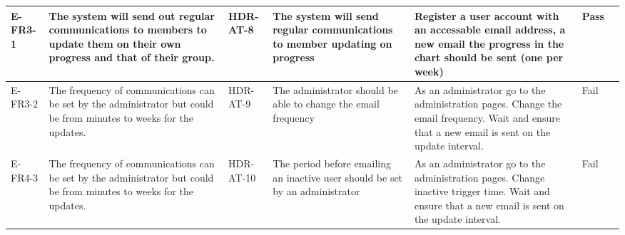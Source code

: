 \begin{longtable}{ |l|p{3cm}|l|p{5cm}|p{5cm}|l|p{6.5cm}|}
E-FR3-1 & The system will send out regular communications to members to update them on their own progress and that of their group. & HDR-AT-8 & The system will send regular communications to member updating on progress & Register a user account with an accessable email address, a new email the progress in the chart should be sent (one per week) & Pass &  \\ \hline
E-FR3-2 & The frequency of communications can be set by the administrator but could be from minutes to weeks for the updates. & HDR-AT-9 & The administrator should be able to change the email frequency & As an administrator go to the administration pages. Change the email frequency. Wait and ensure that a new email is sent on the update interval. & Fail &  \\ \hline
E-FR4-3 & The frequency of communications can be set by the administrator but could be from minutes to weeks for the updates. & HDR-AT-10 & The period before emailing an inactive user should be set by an administrator & As an administrator go to the administration pages. Change inactive trigger time. Wait and ensure that a new email is sent on the update interval. & Fail &  \\ \hline


\end{longtable}